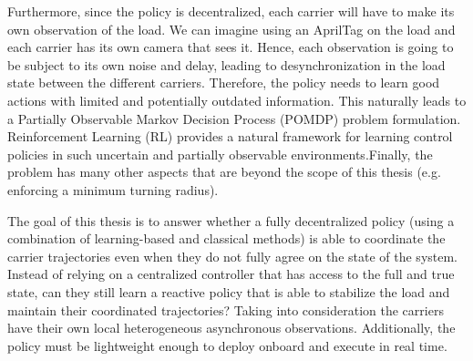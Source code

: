 Furthermore, since the policy is
decentralized, each carrier will have to make its own observation of the load.
We can imagine using an AprilTag on the load and each carrier has its own
camera that sees it. Hence, each observation is going to be subject to its own
noise and delay, leading to desynchronization in the load state between the
different carriers. Therefore, the policy needs to learn good actions with
limited and potentially outdated information. This naturally leads to a
Partially Observable Markov Decision Process (POMDP) problem formulation.
Reinforcement Learning (RL) provides a natural framework for learning control 
policies in such uncertain and partially observable environments.Finally, 
the problem has many other aspects that are beyond the scope of
this thesis (e.g. enforcing a minimum turning radius).

The goal of this thesis is to answer whether a fully decentralized policy
(using a combination of learning-based and classical methods) is able to
coordinate the carrier trajectories even when they do not fully agree
on the state of the system. Instead of
relying on a centralized controller that has access to the full and true
state, can they still learn a reactive policy that is
able to stabilize the load and maintain their coordinated trajectories?
Taking into consideration the carriers have their own local heterogeneous 
asynchronous observations. Additionally, the policy must be lightweight enough to 
deploy onboard and execute in real time.
